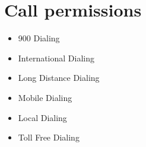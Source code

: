 \documentclass[letterpaper,10pt,english]{sphinxmanual}
\begin{document}
\section{Call permissions}
\label{\detokenize{features:call-permissions}}\begin{itemize}
\item {} 
900 Dialing

\item {} 
International Dialing

\item {} 
Long Distance Dialing

\item {} 
Mobile Dialing

\item {} 
Local Dialing

\item {} 
Toll Free Dialing

\end{itemize}
\end{document}

